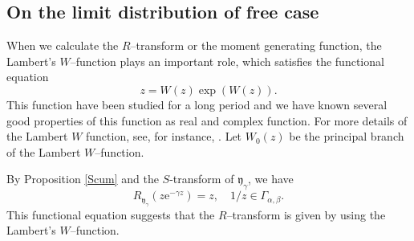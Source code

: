 \documentclass[12pt]{amsart}
\theoremstyle{definition}
\numberwithin{equation}{section}
\begin{document}
\subsection{On the limit distribution of free case}
When we calculate the $R$--transform or the moment generating function, 
the Lambert's $W$--function plays an important role, which
satisfies the functional equation
\[
z=W(z)\exp (W(z)).
\]
This function have been studied for a long period and we have known several good properties of this function as real and complex function.
For more details of the Lambert  $W$ function, see, 
for instance, \cite{Cetc96}.
Let $W_{0}(z)$ be the principal branch of the Lambert $W$--function.

By Proposition \ref{Scum} and the $S$-transform of $\mathfrak{y}_{\gamma}$, 
we have 
\[
R_{\mathfrak{y}_{\gamma}}(z\mathrm{e}^{-\gamma z})=z , \quad 1/z \in \Gamma_{\alpha,\beta}.
\]
This functional equation suggests that the $R$--transform is given by using the Lambert's $W$--function.
\end{document}
